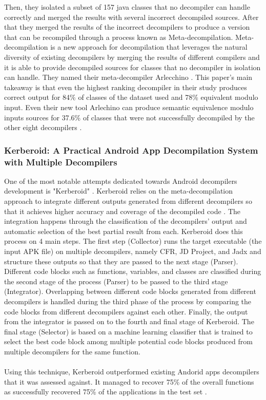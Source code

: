 \documentclass[conference,a4paper]{IEEEtran}
\begin{document}
Then, they isolated a subset of 157 java classes that no decompiler can handle correctly and merged the results with several incorrect decompiled sources.
After that they merged the results of the incorrect decompilers to produce a version that can be recompiled through a process known as Meta-decompilation. Meta-decompilation is a new approach for decompilation that leverages the natural diversity of existing decompilers by merging the results of different compilers and it is able to provide decompiled sources for classes that no decompiler in isolation can handle. They named their meta-decompiler Arlecchino \cite{harrand_java_2020}.
This paper’s main takeaway is that even the highest ranking decompiler in their study produces correct output for 84\% of classes of the dataset used and 78\% equivalent modulo input. Even their new tool Arlechino can produce semantic equivalence modulo inputs sources for 37.6\% of classes that were not successfully decompiled by the other eight decompilers \cite{harrand_java_2020}.
\subsubsection{Kerberoid: A Practical Android App Decompilation System with Multiple Decompilers}
One of the most notable attempts dedicated towards Android decompilers development is "Kerberoid" \cite{jang_kerberoid_2019}. Kerberoid relies on the meta-decompilation approach to integrate different outputs generated from different decompilers so that it achieves higher accuracy and coverage of the decompiled code \cite{jang_kerberoid_2019}. The integration happens through the classification of the decompilers' output and automatic selection of the best partial result from each. Kerberoid does this process on 4 main steps. The first step (Collector) runs the target executable (the input APK file) on multiple decompilers, namely CFR, JD Project, and Jadx and structure these outputs so that they are passed to the next stage (Parser). Different code blocks such as functions, variables, and classes are classified during the second stage of the process (Parser) to be passed to the third stage (Integrator). Overlapping between different code blocks generated from different decompilers is handled during the third phase of the process by comparing the code blocks from different decompilers against each other. Finally, the output from the integrator is passed on to the fourth and final stage of Kerberoid. The final stage (Selector) is based on a machine learning classifier that is trained to select the best code block among multiple potential code blocks produced from multiple decompilers for the same function.\\\\
Using this technique, Kerberoid outperformed existing Andorid apps decompilers that it was assessed against. It managed to recover 75\% of the overall functions as successfully recovered 75\% of the applications in the test set \cite{jang_kerberoid_2019}.
\end{document}
